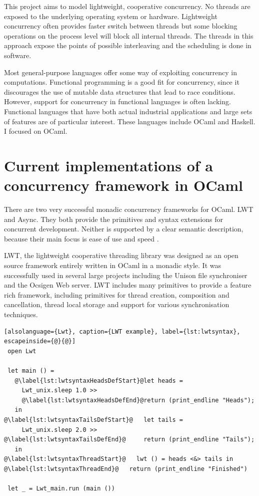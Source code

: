 \documentclass[12pt,twoside,notitlepage]{report}
\theoremstyle{plain}%
\theoremstyle{definition}
\theoremstyle{remark}
\begin{document}
This project aims to model lightweight, cooperative concurrency. No threads are exposed to the underlying operating system or hardware. Lightweight concurrency often provides faster switch between threads  but some blocking operations on the process level will block all internal threads. The threads in this approach expose the points of possible interleaving and the scheduling is done in software.

Most general-purpose languages offer some way of exploiting concurrency in computations. Functional programming is a good fit for concurrency, since it discourages the use of mutable data structures that lead to race conditions.  However, support for concurrency in functional languages is often lacking. Functional languages that have both actual industrial applications and large sets of features are of particular interest. These languages include OCaml and Haskell. I focused on OCaml. 
 

\section{Current implementations of a concurrency framework in OCaml}
There are two very successful monadic concurrency frameworks for OCaml. LWT\cite{LWT} and Async\cite{Async}. They both provide the primitives and syntax extensions for concurrent development. Neither is supported by a clear semantic description, because their main focus is ease of use and speed . 

LWT, the lightweight cooperative threading library\cite{vouillon2008lwt} was designed as an open source framework entirely written in OCaml in a monadic style. It was successfully used in several large projects including the Unison file synchroniser and the Ocsigen Web server. LWT includes many primitives to provide a feature rich framework, including primitives for thread creation, composition and cancellation, thread local storage and support for various synchronisation techniques. 


\begin{minipage}{\linewidth}

\begin{lstlisting}[alsolanguage={Lwt}, caption={LWT example}, label={lst:lwtsyntax}, escapeinside={@}{@}]
 open Lwt
 
 let main () =
   @\label{lst:lwtsyntaxHeadsDefStart}@let heads =
     Lwt_unix.sleep 1.0 >>
     @\label{lst:lwtsyntaxHeadsDefEnd}@return (print_endline "Heads");
   in
@\label{lst:lwtsyntaxTailsDefStart}@   let tails =
     Lwt_unix.sleep 2.0 >>
@\label{lst:lwtsyntaxTailsDefEnd}@     return (print_endline "Tails");
   in
@\label{lst:lwtsyntaxThreadStart}@   lwt () = heads <&> tails in
@\label{lst:lwtsyntaxThreadEnd}@   return (print_endline "Finished")
 
 let _ = Lwt_main.run (main ())
\end{lstlisting}

\end{minipage}
\end{document}

